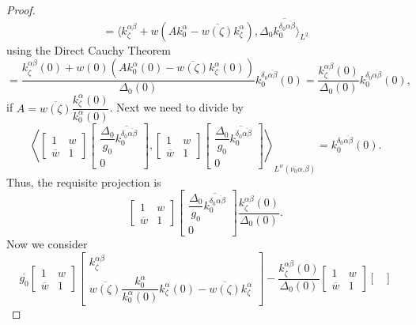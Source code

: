 \documentclass[reqno,11pt,centertags]{article}
\newcommand{\z}{\zeta}
\theoremstyle{definition}
\def\a{\alpha}
\def\b{\beta}
\def\d{\delta}
\def\D{\Delta}
\def\z{\zeta}
\begin{document}
\begin{proof}
$$$$
$$
=\langle
k^{\alpha\beta}_\zeta +
w(A k^\a_0-\overline{w(\zeta)} k^\alpha_\zeta)
,
\D_0 \overline{k^{\d_0\overline{\alpha\b}}_0}
\rangle_{L^2}
$$
using the Direct Cauchy Theorem
$$
=
\dfrac
{k^{\alpha\beta}_\zeta (0)+
w(0)(A k^\a_0(0)-\overline{w(\zeta)} k^\alpha_\zeta(0))}
{\D_0(0)}
k^{\d_0\overline{\alpha\b}}_0(0)
=
\dfrac
{k^{\alpha\beta}_\zeta (0)}
{\D_0(0)}
k^{\d_0\overline{\alpha\b}}_0(0),
$$
if $A=\overline{w(\zeta)} \dfrac{k^\a_\z(0)}{k^\a_0(0)}$.
Next we need to divide by
$$
\left\langle
\begin{bmatrix}
1 & w \\
\overline{w} & 1
\end{bmatrix}
\begin{bmatrix}
\dfrac{\D_0}{g_0}\overline{k^{\d_0\overline{\alpha\b}}_0}
\\
0
\end{bmatrix}
,
\begin{bmatrix}
1 & w \\
\overline{w} & 1
\end{bmatrix}
\begin{bmatrix}
\dfrac{\D_0}{g_0}\overline{k^{\d_0\overline{\alpha\b}}_0}
\\
0
\end{bmatrix}
\right\rangle_{L^w(\overline{\nu_0}\a.\b)}
=k^{\d_0\overline{\alpha\b}}_0(0).
$$
Thus, the requisite projection is
$$
\begin{bmatrix}
1 & w \\
\overline{w} & 1
\end{bmatrix}
\begin{bmatrix}
\dfrac{\D_0}{g_0}\overline{k^{\d_0\overline{\alpha\b}}_0}
\\
0
\end{bmatrix}
\dfrac{k^{\alpha\beta}_\zeta (0)}{\D_0(0)}
.
$$
Now we consider
$$
\overline{g_0}
\left[\begin{array}{cc} 1& w \\
\overline{w} & 1\end{array}\right]\left[\begin{array}{c} k^{\alpha\beta}_\zeta \\
\overline{w(\zeta)} \dfrac{k^\a_0}{k^\a_0(0)}k^\alpha_\zeta(0)-\overline{w(\zeta)} k^\alpha_\zeta \end{array}\right]
-
\dfrac
{k^{\alpha\beta}_\zeta (0)}
{\D_0(0)}
\begin{bmatrix}
1 & w \\
\overline{w} & 1
\end{bmatrix}
\begin{bmatrix}

\end{bmatrix}$$
\end{proof}
\end{document}
